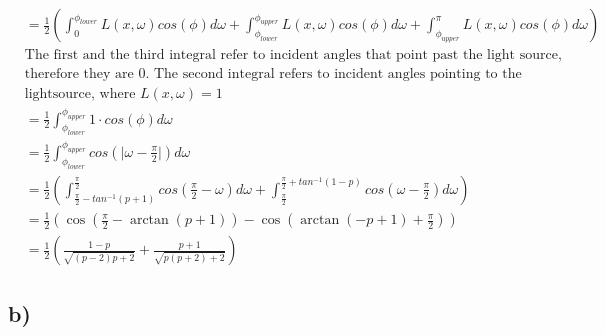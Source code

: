 \documentclass[a4paper]{scrartcl}
\begin{document}
    \begin{align*}
      &=\frac{1}{2}(\int_{0}^{\phi_{lower}} L(x,\omega)cos(\phi)d\omega + \int_{\phi_{lower}}^{\phi_{upper}} L(x,\omega)cos(\phi)d\omega + \int_{\phi_{upper}}^{\pi} L(x,\omega)cos(\phi)d\omega)\\
      &\text{The first and the third integral refer to incident angles that point past the light source, } \\
      &\text{therefore they are 0. The second integral refers to incident angles pointing to the } \\
      &\text{lightsource, where } L(x,\omega) = 1\\
      &=\frac{1}{2} \int_{\phi_{lower}}^{\phi_{upper}} 1\cdot cos(\phi)d\omega\\
      &=\frac{1}{2} \int_{\phi_{lower}}^{\phi_{upper}} cos(\lvert \omega - \frac{\pi}{2} \rvert)d\omega \\
      &=\frac{1}{2} \left( \int_{\frac{\pi}{2} - tan^{-1}(p+1)}^{\frac{\pi}{2}} cos(\frac{\pi}{2} - \omega )d\omega +  \int_{\frac{\pi}{2}}^{\frac{\pi}{2} + tan^{-1}(1-p)}cos(\omega - \frac{\pi}{2} )d\omega\right)\\
      &= \frac{1}{2}\left(\cos \left(\frac{\pi }{2}-\arctan \left(p+1\right)\right)-\cos \left(\arctan \left(-p+1\right)+\frac{\pi }{2}\right)\right) \\
      &= \frac{1}{2}\left( \frac{1-p}{\sqrt{(p-2)p + 2}} + \frac{p+1}{\sqrt{p(p+2) + 2}} \right)
    \end{align*}


  

\subsection*{b)}
\end{document}
